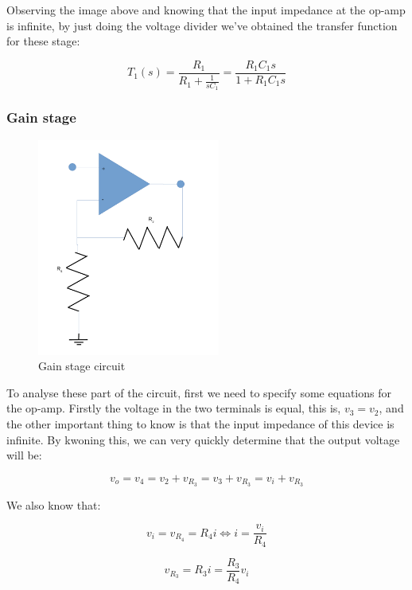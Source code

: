Observing the image above and knowing that the input impedance at the op-amp is infinite, by just doing the voltage divider we've obtained the transfer function for these stage:

\begin{equation}
T_1(s) = \frac{R_1}{R_1 + \frac{1}{sC_1}} = \frac{R_1C_1s}{1+R_1C_1s}
\end{equation}   

\subsubsection{Gain stage}

\begin{figure}[H] 
\centering
\includegraphics[width= 6cm]{amp_l5.pdf} 
\caption{Gain stage circuit}
\label{gainstage}
\end{figure}

To analyse these part of the circuit, first we need to specify some equations for the op-amp. 
Firstly the voltage in the two terminals is equal, this is, $v_3 = v_2$, and the other important thing to know is that the input impedance of this device is infinite. By kwoning this, we can very quickly determine that the output voltage will be:

\begin{equation}
v_o = v_4 = v_2 + v_{R_3} = v_3 + v_{R_3} = v_i + v_{R_3}
\end{equation} 

We also know that:

\begin{equation}
v_i = v_{R_4} = R_4i \iff i = \frac{v_i}{R_4}
\end{equation}

\begin{equation}
v_{R_3} = R_3i = \frac{R_3}{R_4}v_i
\end{equation}


